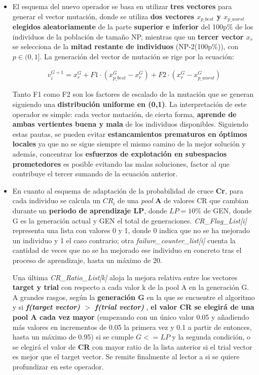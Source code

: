 \begin{enumerate}
	\begin{itemize}
		\item El esquema del nuevo operador se basa en utilizar \textbf{tres vectores} para generar el vector mutación, donde se utiliza \textbf{dos vectores $x_{p\_best}$ y $x_{p\_worst}$ elegidos aleatoriamente} de la parte \textbf{superior e inferior} del 100p\% de los individuos de la población de tamaño NP, mientras que un \textbf{tercer vector $x_r$} se selecciona de la \textbf{mitad restante de individuos} (NP-2(100p\%)), con $p \in (0,1]$. La generación del vector de mutación se rige por la ecuación:
		
		\begin{equation}\label{eq:EADE_Mutation}
		\begin{gathered}
		v_i^{G+1} = x_r^G + F1 \cdot (x_{p\_best}^G - x_r^G) + F2 \cdot (x_r^G - x_{p\_worst}^G)
		\end{gathered}
		\end{equation}
		
		Tanto F1 como F2 son los factores de escalado de la mutación que se generan siguiendo una \textbf{distribución uniforme en (0,1)}. La interpretación de este operador es simple: cada vector mutación, de cierta forma, \textbf{aprende de ambas vertientes buena y mala} de los individuos disponibles. Siguiendo estas pautas, se pueden evitar \textbf{estancamientos prematuros en óptimos locales} ya que no se sigue siempre el mismo camino de la mejor solución y además, concentrar los \textbf{esfuerzos de explotación en subespacios prometedores} es posible evitando las malas soluciones, factor al que contribuye el tercer sumando de la ecuación anterior.
		
		\item En cuanto al esquema de adaptación de la probabilidad de cruce \textbf{Cr}, para cada individuo se calcula un $CR_i$ de una \textit{pool} \textbf{A} de valores CR que cambian durante un \textbf{periodo de aprendizaje LP}, donde $LP = 10\%$ de GEN, donde G es la generación actual y GEN el total de generaciones. \textit{CR\_Flag\_List[i]} representa una lista con valores 0 y 1, donde 0 indica que no se ha mejorado un individuo y 1 el caso contrario; otra \textit{failure\_counter\_list[i]} cuenta la cantidad de veces que no se ha mejorado ese individuo en concreto tras el proceso de aprendizaje, hasta un máximo de 20. 
		
		Una última \textit{CR\_Ratio\_List[k]} aloja la mejora relativa entre los vectores \textbf{target y trial} con respecto a cada valor k de la pool A en la generación G. A grandes rasgos, según la \textbf{generación G} en la que se encuentre el algoritmo y si \textbf{\textit{f(target vector)} $>$ \textit{f(trial vector)} }, \textbf{el valor CR se elegirá de una pool A cada vez mayor} (empezando con un único valor 0.05 y añadiendo más valores en incrementos de 0.05 la primera vez y 0.1 a partir de entonces, hasta un máximo de 0.95) si se cumple $G<=LP$ y la segunda condición, o se elegirá el valor de \textbf{CR} con mayor ratio de la lista anterior si el trial vector es mejor que el target vector. Se remite finalmente al lector a \cite{ANDE} si se quiere profundizar en este operador.
	\end{itemize}


\end{enumerate}

